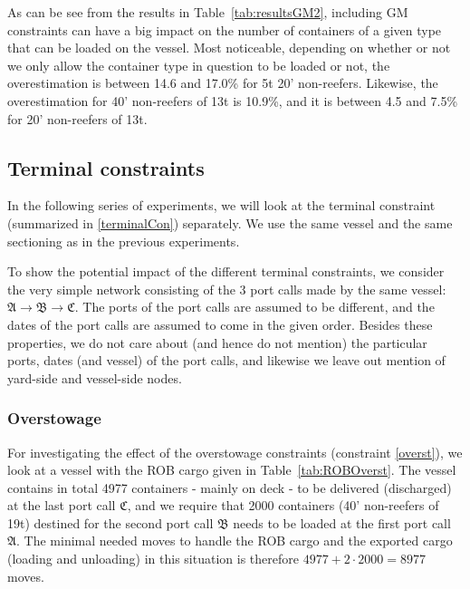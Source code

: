 As can be see from the results in Table~\ref{tab:resultsGM2}, including GM constraints can have a big impact on the number of containers of a given type that can be loaded on the vessel. Most noticeable, depending on whether or not we only allow the container type in question to be loaded or not, %
the overestimation is between 14.6 and 17.0\% for 5t 20' non-reefers. Likewise, the overestimation for 40' non-reefers of 13t is %
10.9\%, and it is between 4.5 and 7.5\% for 20' non-reefers of 13t. %

\subsection{Terminal constraints} %
In the following series of experiments, we will look at the terminal constraint (summarized in \eqref{terminalCon}) separately. We use the same vessel and the same sectioning as in the previous experiments.  

To show the potential impact of the different terminal constraints, we consider the very simple network consisting of the 3 port calls made by the same vessel: $\mathfrak{A} \rightarrow \mathfrak{B} \rightarrow \mathfrak{C}$. The ports of the port calls are assumed to be different, and the dates of the port calls are assumed to come in the given order. Besides these properties, we do not care about (and hence do not mention) the particular ports, dates (and vessel) of the port calls, and likewise we leave out mention of yard-side and vessel-side nodes. 

\subsubsection{Overstowage}
For investigating the effect of the overstowage constraints (constraint \eqref{overst}), we look at a vessel with the ROB cargo given in Table~\ref{tab:ROBOverst}. The vessel contains in total 4977 containers - mainly on deck - to be delivered (discharged) at the last port call $\mathfrak{C}$, and we require that 2000 containers (40' non-reefers of 19t) destined for the second port call $\mathfrak{B}$ needs to be loaded at the first port call $\mathfrak{A}$. The minimal needed moves to handle the ROB cargo and the exported cargo (loading and unloading) in this situation is therefore $4977 + 2\cdot 2000 = 8977$ moves.%

